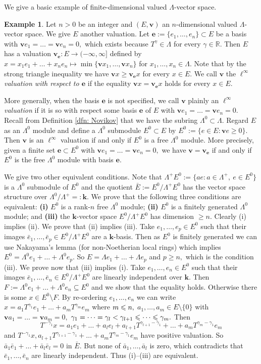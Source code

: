 \documentclass{article}
\theoremstyle{plain}%
\theoremstyle{definition}
\newtheorem{exam}[thm]{Example}
\numberwithin{equation}{section}
\numberwithin{figure}{section}
\def\l{\label}
\def\ge{\geqslant}
\def\le{\leqslant\nobreak}
\def\R{{\mathbin{\mathbb R}}}
\def\ga{\gamma}
\def\La{\Lambda}
\def\-{\setminus}
\def\iy{\infty}
\def\sb{\subseteq}
\def\k{{\mathbf{k}}}\def\b{{\mathbf{b}}}\def\x{{\mathbf{x}}}
\def\v{{\mathbf{v}}}\def\cl{{\rm cl}}\def\alg{{\rm alg}}\def\geom{{\rm geom}}\def\loc{{\rm loc}}\def\dirlim{\displaystyle\varinjlim}
\begin{document}
We give a basic example of finite-dimensional valued $\La$-vector space.
\begin{exam}\l{ex: ell inf}
Let $n>0$ be an integer and $(E,\v)$ an $n$-dimensional valued $\La$-vector space. We give $E$ another valuation. Let $\bm e:=\{e_1,\dots,e_n\}\subset E$ be a basis with $\v e_1=\dots=\v e_n=0,$ which exists because $T^\ga\in\La$ for every $\ga\in\R.$
Then $E$ has a valuation $\v_{\bm e}:E\to(-\iy,\iy]$ defined by $x=x_1e_1+\dots+x_n e_n\mapsto\min\{\v x_1,\dots,\v x_n\}$ for $x_1,\dots,x_n\in\La.$ Note that by the strong triangle inequality we have $\v x\ge \v_{\bm e} x$ for every $x\in E.$ We call $\v$ the {\it $\ell^\iy$ valuation with respect to $\bm e$} if the equality $\v x=\v_{\bm e}x$ holds for every $x\in E.$ 

More generally, when the basis $\bm e$ is not specified, we call $\v$ plainly an {\it $\ell^\iy$ valuation} if it is so with respect some basis $\bm e$ of $E$ with $\v e_1=\dots=\v e_n=0.$ Recall from Definition \ref{dfn: Novikov} that we have the subring $\La^0\subset\La.$ Regard $E$ as an $\La^0$ module and define a $\La^0$ submodule $E^0\subset E$ by $E^0:=\{e\in E:\v e\ge 0\}.$ Then $\v$ is an $\ell^\iy$ valuation if and only if $E^0$ is a free $\La^0$ module. More precisely, given a finite set $\bm e\subset E^0$ with $\v e_1=\dots=\v e_n=0,$ we have $\v=\v_{\bm e}$ if and only if $E^0$ is the free $\La^0$ module with basis $\bm e.$ 

We give two other equivalent conditions. Note that $\La^+E^0:=\{ae: a\in\La^+,\ e\in E^0\}$ is a $\La^0$ submodule of $E^0$ and the quotient $\bar E:=E^0/\La^+E^0$ has the vector space structure over $\La^0/\La^+=:\k.$
We prove that the following three conditions are equivalent: {\bf(i)} $E^0$ is a rank-$n$ free $\La^0$ module; {\bf(ii)} $E^0$ is a finitely generated $\La^0$ module; and {\bf(iii)} the $\k$-vector space $E^0/\La^+E^0$ has dimension $\ge n.$
Clearly (i) implies (ii). We prove that (ii) implies (iii). Take $e_1,\dots,e_p\in E^0$ such that their images $\bar e_1,\dots,\bar e_p\in E^0/\La^+E^0$ are a $\k$-basis. Then as $E^0$ is finitely generated we can use Nakayama's lemma \cite[Chapter X, Lemma 4.3]{Lang} (for non-Noetherian local rings) which implies $E^0=\La^0e_1+\dots+\La^0e_p.$ So $E=\La e_1+\dots+\La e_p$ and $p\ge n,$ which is the condition (iii).
We prove now that (iii) implies (i). Take $e_1,\dots,e_n\in E^0$ such that their images $\bar e_1,\dots,\bar e_n\in E^0/\La^+E^0$ are linearly independent over $\k.$
Then $F:=\La^0e_1+\dots+\La^0e_n\sb E^0$ and we show that the equality holds.
Otherwise there is some $x\in E^0\-F.$
By re-ordering $e_1,\dots,e_n$ we can write $x=a_1T^{\ga_1}e_1+\dots+a_mT^{\ga_m}e_m$ where $m\le n,$ $a_1,\dots,a_m\in E\-\{0\}$ with $\v a_1=\dots=\v a_m=0,$ $\ga_1=\dots=\ga_l<\ga_{l+1}\le\dots\le\ga_m.$
Then
\[T^{-\ga_1}x=a_1e_1+\dots+a_le_l+a_{l+1}T^{\ga_{l+1}-\ga_1}+\dots+a_mT^{\ga_m-\ga_1}e_m\]
and $T^{-\ga_1}x,a_{l+1}T^{\ga_{l+1}-\ga_1}+\dots+a_mT^{\ga_m-\ga_1}e_m$ have positive valuation. So $\bar a_1\bar e_1+\dots
+\bar a_l\bar e_l=0$ in $\bar E.$ But none of $\bar a_1,\dots,\bar a_l$ is zero, which contradicts that $\bar e_1,\dots,\bar e_n$ are linearly independent. Thus (i)--(iii) are equivalent.
\end{exam}
\end{document}
